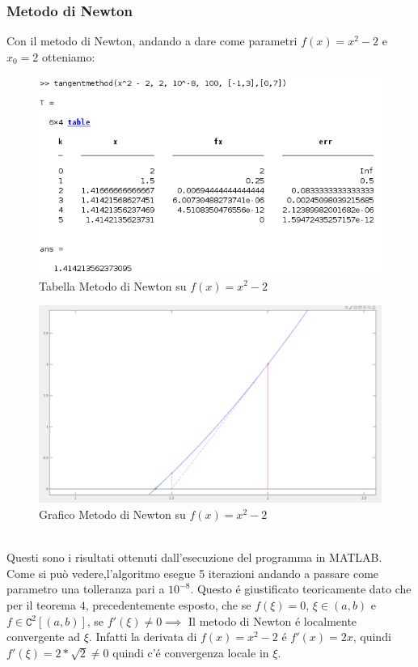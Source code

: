 \documentclass[12pt, letterpaper]{article}
\begin{document}
\subsubsection{Metodo di Newton}
Con il metodo di Newton, andando a dare come parametri $f(x)=x^2-2$ e $x_0=2$ otteniamo:
\begin{figure}[ht!]
    \includegraphics[scale=0.63]{TabellaParabolaNewton.png}
    \caption{Tabella Metodo di Newton su $f(x)=x^2-2$}
\end{figure}
\begin{figure}[ht!]
    \includegraphics[scale=0.44]{ParabolaNewton.png}
    \caption{Grafico Metodo di Newton su $f(x)=x^2-2$}
\end{figure} \\
Questi sono i risultati ottenuti dall'esecuzione del programma in MATLAB.\\ Come si può vedere,l'algoritmo esegue 5 iterazioni andando a passare come parametro una tolleranza pari a $10^{-8}$.
Questo \'e giustificato teoricamente dato che per il teorema $4$, precedentemente esposto, che se $f(\xi)=0$, $\xi \in (a,b)$ e $f \in \mathtt{C}^2[(a,b)]$, se $f'(\xi) \neq 0 \implies$ Il metodo di Newton \'e localmente convergente ad $\xi$.
Infatti la derivata di $f(x)=x^2-2$ \'e $f'(x)=2x$, quindi $f'(\xi)=2*\sqrt{2}\neq 0$ quindi c'\'e convergenza locale in $\xi$.
\end{document}
